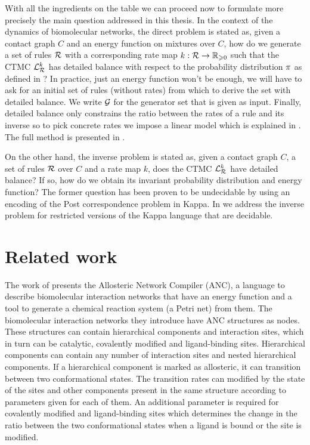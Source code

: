With all the ingredients on the table %
we can proceed now to formulate more precisely
the main question addressed in this thesis.
In the context of the dynamics of biomolecular networks,
the direct problem is stated as,
given a contact graph $C$ and
an energy function on mixtures over $C$,
how do we generate a set of rules $\mathcal{R}$
with a corresponding rate map $k: \mathcal{R} \to \mathbb{R}_{\geqslant 0}$
such that the CTMC $\mathcal{L}^k_{\mathcal{R}}$ has detailed balance with respect to
the probability distribution $\pi$ as defined in ?
In practice, just an energy function won't be enough,
we will have to ask for an initial set of rules (without rates)
from which to derive the set with detailed balance.
We write $\mathcal{G}$ for the generator set that is given as input.
Finally, detailed balance only constrains the ratio between
the rates of a rule and its inverse so to pick concrete rates
we impose a linear model which is explained in .
The full method is presented in .

On the other hand, the inverse problem is stated as,
given a contact graph $C$,
a set of rules $\mathcal{R}$ over $C$
and a rate map $k$,
does the CTMC $\mathcal{L}^k_{\mathcal{R}}$ have detailed balance?
If so, how do we obtain its invariant probability distribution
and energy function?
The former question has been proven to be undecidable by \citet{et1}
using an encoding of the Post correspondence problem \citep{post}
in Kappa.
In  we address the inverse problem for
restricted versions of the Kappa language
that are decidable.


\section{Related work}

The work of \citet{anc} presents the Allosteric Network Compiler
(ANC), a language to describe biomolecular interaction networks
that have an energy function and a tool to generate
a chemical reaction system (\ie a Petri net) from them.
The biomolecular interaction networks they introduce
have ANC structures as nodes.
These structures can contain hierarchical components and
interaction sites, which in turn can be catalytic,
covalently modified and ligand-binding sites.
Hierarchical components can contain any number of
interaction sites and nested hierarchical components.
If a hierarchical component is marked as allosteric,
it can transition between two conformational states.
The transition rates can modified by the state of the sites and
other components present in the same structure
according to parameters given for each of them.
An additional parameter is required for covalently modified
and ligand-binding sites which determines the change in the ratio
between the two conformational states when a ligand is bound
or the site is modified.

